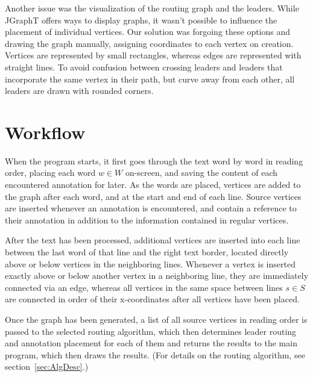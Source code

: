 \documentclass[11pt,a4paper]{vutinfth}
\begin{document}
Another issue was the visualization of the routing graph and the leaders. While JGraphT offers ways to display graphs, it wasn't possible to influence the placement of individual vertices. Our solution was forgoing these options and drawing the graph manually, assigning coordinates to each vertex on creation. Vertices are represented by small rectangles, whereas edges are represented with straight lines. To avoid confusion between crossing leaders and leaders that incorporate the same vertex in their path, but curve away from each other, all leaders are drawn with rounded corners.


\section{Workflow}%

When the program starts, it first goes through the text word by word in reading order, placing each word $w \in W$  on-screen, and saving the content of each encountered annotation for later. As the words are placed, vertices are added to the graph after each word, and at the start and end of each line. Source vertices are inserted whenever an annotation is encountered, and contain a reference to their annotation in addition to the information contained in regular vertices.

After the text has been processed, additional vertices are inserted into each line between the last word of that line and the right text border, located directly above or below vertices in the neighboring lines. Whenever a vertex is inserted exactly above or below another vertex in a neighboring line, they are immediately connected via an edge, whereas all vertices in the same space between lines $s \in S$ are connected in order of their x-coordinates after all vertices have been placed.

Once the graph has been generated, a list of all source vertices in reading order is passed to the selected routing algorithm, which then determines leader routing and annotation placement for each of them and returns the results to the main program, which then draws the results. (For details on the routing algorithm, see section~\ref{sec:AlgDesc}.)
\end{document}
